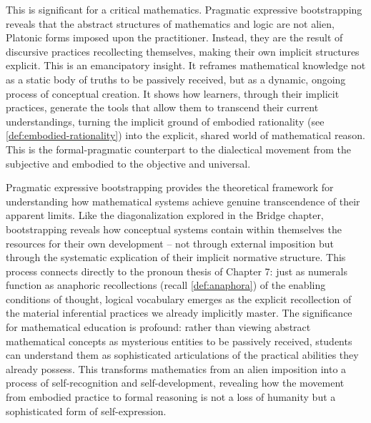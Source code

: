 \documentclass[12pt]{book}
\begin{document}
This is significant for a critical mathematics. Pragmatic expressive bootstrapping reveals that the abstract structures of mathematics and logic are not alien, Platonic forms imposed upon the practitioner. Instead, they are the result of discursive practices recollecting themselves, making their own implicit structures explicit. This is an emancipatory insight. It reframes mathematical knowledge not as a static body of truths to be passively received, but as a dynamic, ongoing process of conceptual creation. It shows how learners, through their implicit practices, generate the tools that allow them to transcend their current understandings, turning the implicit ground of embodied rationality (see \ref{def:embodied-rationality}) into the explicit, shared world of mathematical reason. This is the formal-pragmatic counterpart to the dialectical movement from the subjective and embodied to the objective and universal.

Pragmatic expressive bootstrapping provides the theoretical framework for understanding how mathematical systems achieve genuine transcendence of their apparent limits. Like the diagonalization explored in the Bridge chapter, bootstrapping reveals how conceptual systems contain within themselves the resources for their own development -- not through external imposition but through the systematic explication of their implicit normative structure. This process connects directly to the pronoun thesis of Chapter 7: just as numerals function as anaphoric recollections (recall \ref{def:anaphora}) of the enabling conditions of thought, logical vocabulary emerges as the explicit recollection of the material inferential practices we already implicitly master. The significance for mathematical education is profound: rather than viewing abstract mathematical concepts as mysterious entities to be passively received, students can understand them as sophisticated articulations of the practical abilities they already possess. This transforms mathematics from an alien imposition into a process of self-recognition and self-development, revealing how the movement from embodied practice to formal reasoning is not a loss of humanity but a sophisticated form of self-expression. 

\end{document}
